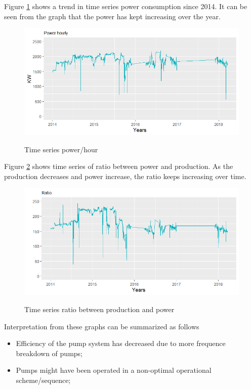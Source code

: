 Figure \ref{ch05_fig_energy_power} shows a trend in time series power consumption since 2014. It can be seen from the graph that the power has kept increasing over the year. 

\begin{figure}[!htb]
	\includegraphics[scale=0.5]{figures/ch05_fig_energy_power} \\
	\caption{Time series power/hour}
	\label{ch05_fig_energy_power} 
\end{figure}
Figure \ref{ch05_fig_energy_ratio} shows time series of ratio between power and production. As the production decreases and power increase, the ratio keeps increasing over time. 

\begin{figure}[!htb]
	\includegraphics[scale=0.5]{figures/ch05_fig_energy_ratio} \\
	\caption{Time series ratio between production and power}
	\label{ch05_fig_energy_ratio} 
\end{figure}

Interpretation from these graphs can be summarized as follows

\begin{itemize}
\item Efficiency of the pump system has decreased due to more frequence breakdown of pumps;
\item Pumps might have been operated in a non-optimal operational scheme/sequence;
\end{itemize}

